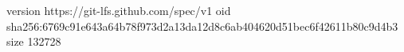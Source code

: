version https://git-lfs.github.com/spec/v1
oid sha256:6769c91e643a64b78f973d2a13da12d8c6ab404620d51bec6f42611b80c9d4b3
size 132728

